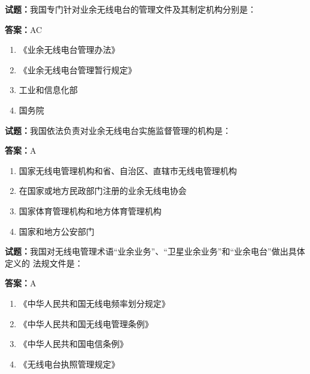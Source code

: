 \documentclass{ctexbook}
\begin{document}
\textbf{试题：}我国专门针对业余无线电台的管理文件及其制定机构分别是： 

\textbf{答案：}AC 

\begin{enumerate}[leftmargin=3em]
  \item 《业余无线电台管理办法》 

  \item 《业余无线电台管理暂行规定》 

  \item 工业和信息化部 

  \item 国务院 

\end{enumerate}





\vspace{1em}

\textbf{试题：}我国依法负责对业余无线电台实施监督管理的机构是： 

\textbf{答案：}A 

\begin{enumerate}[leftmargin=3em]
  \item 国家无线电管理机构和省、自治区、直辖市无线电管理机构 

  \item 在国家或地方民政部门注册的业余无线电协会 

  \item 国家体育管理机构和地方体育管理机构 

  \item 国家和地方公安部门 

\end{enumerate}





\vspace{1em}

\textbf{试题：}我国对无线电管理术语“业余业务”、“卫星业余业务”和“业余电台”做出具体定义的
法规文件是： 

\textbf{答案：}A 

\begin{enumerate}[leftmargin=3em]
  \item 《中华人民共和国无线电频率划分规定》 

  \item 《中华人民共和国无线电管理条例》 

  \item 《中华人民共和国电信条例》 

  \item 《无线电台执照管理规定》 

\end{enumerate}
\end{document}
